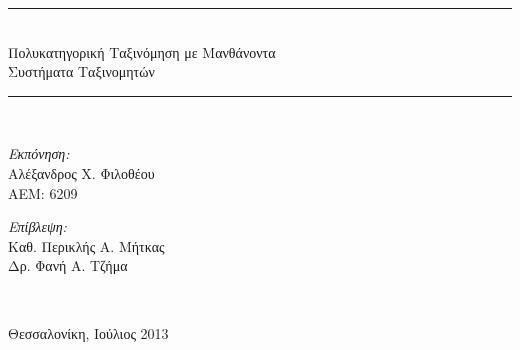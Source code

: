 \begin{titlepage}
\begin{center}
  \rule{350pt}{4pt} \\[0.4cm]
    \LARGE{Πολυκατηγορική Ταξινόμηση με Μανθάνοντα\\[0.4cm] Συστήματα Ταξινομητών} \\[0.4cm]
  \rule{350pt}{4pt} \\[6cm]

  \begin{minipage}{0.4\textwidth}
  \begin{flushleft} \large
  \emph{Εκπόνηση:} \\
 	 Αλέξανδρος Χ. Φιλοθέου \\
  	ΑΕΜ: 6209
  \end{flushleft}
  \end{minipage}
  \begin{minipage}{0.4\textwidth}
  \begin{flushright} \large
  \emph{Επίβλεψη:} \\
  Καθ. Περικλής Α. Μήτκας\\
  Δρ. Φανή Α. Τζήμα
  \end{flushright}
  \end{minipage}
  \\[1cm]
  \vfill

  \large Θεσσαλονίκη, Ιούλιος 2013
  
\end{center}
\end{titlepage}
\newevenside


\newevenside

\newevenside


\newevenside



\setcounter{tocdepth}{2}
\tableofcontents

\listoffigures

\listoftables

\listofalgorithms
\newevenside
{}

